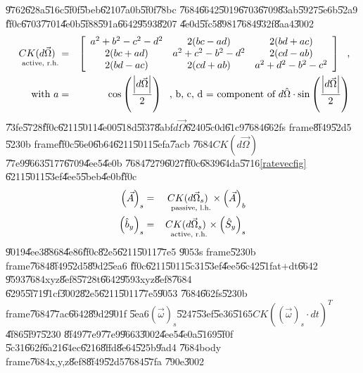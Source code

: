 \documentclass[12pt,a4paper]{article}
\begin{document}
\U{9762}\U{628a}\U{516c}\U{5f0f}\U{5beb}\U{6210}\U{7a0b}\U{5f0f}\U{78bc}%
\U{7684}\U{6642}\U{5019}\U{6703}\U{6709}\U{83ab}\U{5927}\U{5e6b}\U{52a9}%
\U{ff0c}\U{6703}\U{7701}\U{4e0b}\U{5f88}\U{591a}\U{6642}\U{9593}\U{8207}%
\U{4e0d}\U{5fc5}\U{8981}\U{7684}\U{932f}\U{8aa4}\U{3002}%
\begin{eqnarray*}
\underset{\text{active, r.h.}}{CK(d\vec{\Omega})} &=&\left[ 
\begin{array}{ccc}
a^{2}+b^{2}-c^{2}-d^{2} & 2(bc-ad) & 2(bd+ac) \\ 
2(bc+ad) & a^{2}+c^{2}-b^{2}-d^{2} & 2(cd-ab) \\ 
2(bd-ac) & 2(cd+ab) & a^{2}+d^{2}-b^{2}-c^{2}%
\end{array}%
\right] \text{,} \\
\text{with }a &=&\cos \left( \frac{\left\vert d\vec{\Omega}\right\vert }{2}%
\right) \text{, b, c, d = component of }d\hat{\Omega}\cdot \sin \left( \frac{%
\left\vert d\vec{\Omega}\right\vert }{2}\right)
\end{eqnarray*}%
\U{73fe}\U{5728}\U{ff0c}\U{6211}\U{5011}\U{4e00}\U{518d}\U{5f37}\U{8abf}$d%
\vec{\Omega}$\U{6240}\U{5c0d}\U{61c9}\U{7684}\U{662f}s frame\U{8f49}\U{52d5}%
\U{5230}b frame\U{ff0c}\U{56e0}\U{6b64}\U{6211}\U{5011}\U{5efa}\U{7acb}%
\U{7684}$CK(d\vec{\Omega})$\U{77e9}\U{9663}\U{5177}\U{6709}\U{4ee5}\U{4e0b}%
\U{7684}\U{7279}\U{6027}\U{ff0c}\U{6839}\U{64da}\U{5716}\ref{ratevecfig}%
\U{6211}\U{5011}\U{53ef}\U{4ee5}\U{5beb}\U{4e0b}\U{ff0c}%
\begin{eqnarray}
\left( \vec{A}\right) _{s} &=&\underset{\text{passive, l.h.}}{CK(d\vec{\Omega%
}_{s})}\times \left( \vec{A}\right) _{b}  \label{frametrans} \\
\left( \hat{b}_{y}\right) _{s} &=&\underset{\text{active, r.h.}}{CK(d\vec{%
\Omega}_{s})}\times \left( \hat{S}_{y}\right) _{s}  \label{vecrot}
\end{eqnarray}%
\U{9019}\U{4ee3}\U{8868}\U{4e86}\U{ff0c}\U{82e5}\U{6211}\U{5011}\U{77e5}%
\U{9053}s frame\U{5230}b frame\U{7684}\U{8f49}\U{52d5}\U{89d2}\U{5ea6}%
\U{ff0c}\U{6211}\U{5011}\U{5c31}\U{53ef}\U{4ee5}\U{6c42}\U{51fa}t+dt\U{6642}%
\U{9593}\U{7684}xyz\U{8ef8}\U{5728}t\U{6642}\U{9593}xyz\U{8ef8}\U{7684}%
\U{6295}\U{5f71}\U{91cf}\U{3002}\U{82e5}\U{6211}\U{5011}\U{77e5}\U{9053}%
\U{7684}\U{662f}s\U{5230}b frame\U{7684}\U{77ac}\U{6642}\U{89d2}\U{901f}%
\U{5ea6}$\left( \vec{\omega}\right) _{s}$\U{5247}\U{53ef}\U{5e36}\U{5165}$%
CK(\left( \vec{\omega}\right) _{s}\cdot dt)^{T}$\U{4f86}\U{5f97}\U{5230}%
\U{8f49}\U{77e9}\U{77e9}\U{9663}\U{3002}\U{4ee5}\U{4e0a}\U{5169}\U{5f0f}%
\U{5c31}\U{662f}\U{6a21}\U{64ec}\U{6216}\U{8ffd}\U{8e64}\U{525b}\U{9ad4}%
\U{7684}body frame\U{7684}x,y,z\U{8ef8}\U{8f49}\U{52d5}\U{7684}\U{57fa}%
\U{790e}\U{3002}
\end{document}
